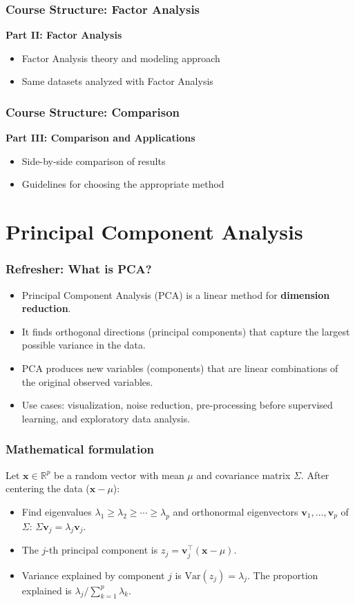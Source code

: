 \documentclass[aspectratio=169]{beamer}
\begin{document}
\begin{frame}[fragile]
    \frametitle{Course Structure: Factor Analysis}
    \textbf{Part II: Factor Analysis}
    \begin{itemize}
        \item Factor Analysis theory and modeling approach  
        \item Same datasets analyzed with Factor Analysis
    \end{itemize}
\end{frame}

\begin{frame}[fragile]
    \frametitle{Course Structure: Comparison}
    \textbf{Part III: Comparison and Applications}
    \begin{itemize}
        \item Side-by-side comparison of results
        \item Guidelines for choosing the appropriate method
    \end{itemize}
\end{frame}

\section{Principal Component Analysis}

\begin{frame}
    \frametitle{Refresher: What is PCA?}
    \begin{itemize}
        \item Principal Component Analysis (PCA) is a linear method for \textbf{dimension reduction}. \pause
        \item It finds orthogonal directions (principal components) that capture the largest possible variance in the data. \pause
        \item PCA produces new variables (components) that are linear combinations of the original observed variables. \pause
        \item Use cases: visualization, noise reduction, pre-processing before supervised learning, and exploratory data analysis. \pause
    \end{itemize}
\end{frame}

\begin{frame}
    \frametitle{Mathematical formulation}
    Let $\mathbf{x}\in\mathbb{R}^p$ be a random vector with mean $\mu$ and covariance matrix $\Sigma$. After centering the data ($\mathbf{x}-\mu$):
    \begin{itemize}
        \item Find eigenvalues $\lambda_1\ge\lambda_2\ge\cdots\ge\lambda_p$ and orthonormal eigenvectors $\mathbf{v}_1,\dots,\mathbf{v}_p$ of $\Sigma$: $\Sigma\mathbf{v}_j=\lambda_j\mathbf{v}_j$. \pause
        \item The $j$-th principal component is $z_j=\mathbf{v}_j^{\top}(\mathbf{x}-\mu)$. \pause
        \item Variance explained by component $j$ is $\mathrm{Var}(z_j)=\lambda_j$. The proportion explained is $\lambda_j/\sum_{k=1}^p\lambda_k$. \pause
    \end{itemize}
\end{frame}
\end{document}
